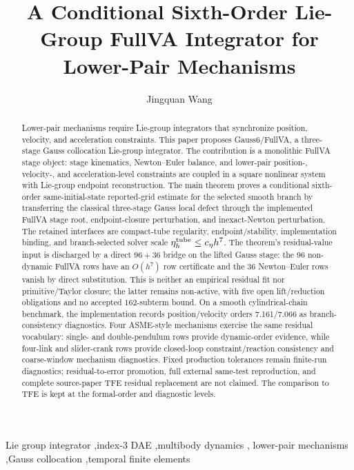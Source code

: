 \documentclass[preprint,12pt]{elsarticle}
\newcommand{\method}{Gauss6\slash FullVA}
\newcommand{\tfe}{TFE}
\begin{document}
\begin{frontmatter}

\title{A Conditional Sixth-Order Lie-Group FullVA Integrator for Lower-Pair Mechanisms}

\author[inst1]{Jingquan Wang}


\begin{abstract}
Lower-pair mechanisms require Lie-group integrators that synchronize
position, velocity, and acceleration constraints. This paper proposes
\method{}, a three-stage Gauss collocation Lie-group integrator. The
contribution is a monolithic
FullVA stage object: stage kinematics, Newton--Euler balance, and lower-pair
position-, velocity-, and acceleration-level constraints are coupled in a
square nonlinear system with Lie-group endpoint reconstruction. The main
theorem proves a conditional sixth-order same-initial-state reported-grid
estimate for the selected smooth branch by transferring the
classical three-stage Gauss local defect through the implemented FullVA stage
root, endpoint-closure perturbation, and inexact-Newton perturbation. The
retained interfaces are compact-tube regularity, endpoint/stability,
implementation binding, and branch-selected solver scale
\(\eta_h^{\rm tube}\le c_\eta h^7\). The theorem's residual-value
input is discharged by a direct \(96+36\)
bridge on the lifted Gauss stage: the 96
non-dynamic FullVA rows have an \(O(h^7)\) row certificate and the 36
Newton--Euler rows vanish by direct substitution. This is neither an
empirical residual fit nor primitive/Taylor closure; the latter remains
non-active, with five open lift/reduction obligations and no accepted
\(162\)-subterm bound. On a
smooth cylindrical-chain benchmark, the implementation
records position/velocity orders 7.161/7.066 as branch-consistency
diagnostics. Four ASME-style
mechanisms exercise the same residual vocabulary: single- and double-pendulum
rows provide dynamic-order evidence, while four-link and slider-crank rows
provide closed-loop constraint/reaction consistency and coarse-window
mechanism diagnostics.
Fixed production tolerances remain finite-run diagnostics; residual-to-error
promotion, full external same-test reproduction, and complete source-paper
\tfe{} residual replacement are not claimed. The comparison to \tfe{} is kept
at the formal-order and diagnostic levels.
\end{abstract}

\begin{keyword}
Lie group integrator \sep index-3 DAE \sep multibody dynamics \sep
lower-pair mechanisms \sep Gauss collocation \sep temporal finite elements
\end{keyword}

\end{frontmatter}
\end{document}
